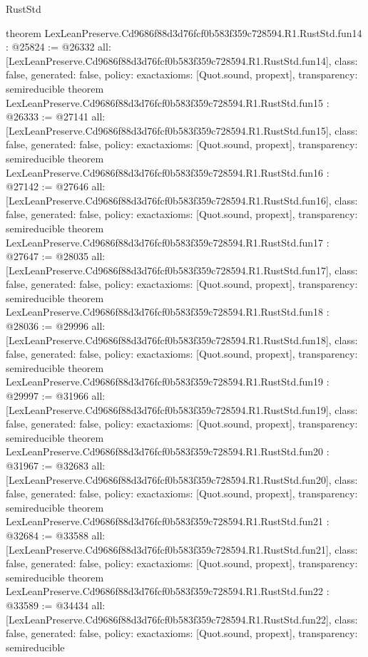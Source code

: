 \begin{lexlean}{RustStd}
\begin{coremodule}
{}
theorem LexLeanPreserve.Cd9686f88d3d76fcf0b583f359c728594.R1.RustStd.fun14 : @25824 := @26332 {
  all: [LexLeanPreserve.Cd9686f88d3d76fcf0b583f359c728594.R1.RustStd.fun14],
  class: false,
  generated: false,
  policy: exact{axioms: [Quot.sound, propext]},
  transparency: semireducible
}
theorem LexLeanPreserve.Cd9686f88d3d76fcf0b583f359c728594.R1.RustStd.fun15 : @26333 := @27141 {
  all: [LexLeanPreserve.Cd9686f88d3d76fcf0b583f359c728594.R1.RustStd.fun15],
  class: false,
  generated: false,
  policy: exact{axioms: [Quot.sound, propext]},
  transparency: semireducible
}
theorem LexLeanPreserve.Cd9686f88d3d76fcf0b583f359c728594.R1.RustStd.fun16 : @27142 := @27646 {
  all: [LexLeanPreserve.Cd9686f88d3d76fcf0b583f359c728594.R1.RustStd.fun16],
  class: false,
  generated: false,
  policy: exact{axioms: [Quot.sound, propext]},
  transparency: semireducible
}
theorem LexLeanPreserve.Cd9686f88d3d76fcf0b583f359c728594.R1.RustStd.fun17 : @27647 := @28035 {
  all: [LexLeanPreserve.Cd9686f88d3d76fcf0b583f359c728594.R1.RustStd.fun17],
  class: false,
  generated: false,
  policy: exact{axioms: [Quot.sound, propext]},
  transparency: semireducible
}
theorem LexLeanPreserve.Cd9686f88d3d76fcf0b583f359c728594.R1.RustStd.fun18 : @28036 := @29996 {
  all: [LexLeanPreserve.Cd9686f88d3d76fcf0b583f359c728594.R1.RustStd.fun18],
  class: false,
  generated: false,
  policy: exact{axioms: [Quot.sound, propext]},
  transparency: semireducible
}
theorem LexLeanPreserve.Cd9686f88d3d76fcf0b583f359c728594.R1.RustStd.fun19 : @29997 := @31966 {
  all: [LexLeanPreserve.Cd9686f88d3d76fcf0b583f359c728594.R1.RustStd.fun19],
  class: false,
  generated: false,
  policy: exact{axioms: [Quot.sound, propext]},
  transparency: semireducible
}
theorem LexLeanPreserve.Cd9686f88d3d76fcf0b583f359c728594.R1.RustStd.fun20 : @31967 := @32683 {
  all: [LexLeanPreserve.Cd9686f88d3d76fcf0b583f359c728594.R1.RustStd.fun20],
  class: false,
  generated: false,
  policy: exact{axioms: [Quot.sound, propext]},
  transparency: semireducible
}
theorem LexLeanPreserve.Cd9686f88d3d76fcf0b583f359c728594.R1.RustStd.fun21 : @32684 := @33588 {
  all: [LexLeanPreserve.Cd9686f88d3d76fcf0b583f359c728594.R1.RustStd.fun21],
  class: false,
  generated: false,
  policy: exact{axioms: [Quot.sound, propext]},
  transparency: semireducible
}
theorem LexLeanPreserve.Cd9686f88d3d76fcf0b583f359c728594.R1.RustStd.fun22 : @33589 := @34434 {
  all: [LexLeanPreserve.Cd9686f88d3d76fcf0b583f359c728594.R1.RustStd.fun22],
  class: false,
  generated: false,
  policy: exact{axioms: [Quot.sound, propext]},
  transparency: semireducible
}
\end{coremodule}
\end{lexlean}
